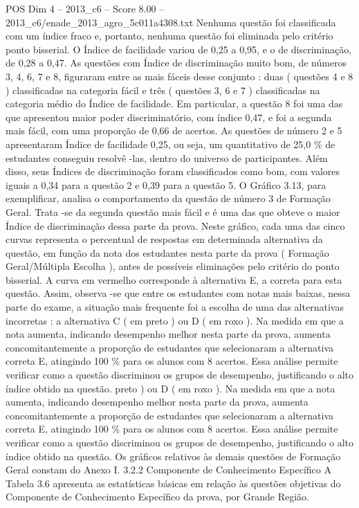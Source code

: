 \begin{textsample}{POS Dim 4 – 2013\_c6 – Score 8.00 – 2013\_c6/enade\_2013\_agro\_5c011a4308.txt}
Nenhuma questão foi classificada com um índice fraco e, portanto, nenhuma questão foi eliminada pelo critério ponto bisserial.
O Índice de facilidade variou de 0,25 a 0,95, e o de discriminação, de 0,28 a 0,47.
As questões com Índice de discriminação muito bom, de números 3, 4, 6, 7 e 8, figuraram entre as mais fáceis desse conjunto : duas ( questões 4 e 8 ) classificadas na categoria fácil e três ( questões 3, 6 e 7 ) classificadas na categoria médio do Índice de facilidade.
Em particular, a questão 8 foi uma das que apresentou maior poder discriminatório, com índice 0,47, e foi a segunda mais fácil, com uma proporção de 0,66 de acertos.
As questões de número 2 e 5 apresentaram Índice de facilidade 0,25, ou seja, um quantitativo de 25,0 \% de estudantes conseguiu resolvê -las, dentro do universo de participantes.
Além disso, seus Índices de discriminação foram classificados como bom, com valores iguais a 0,34 para a questão 2 e 0,39 para a questão 5.
O Gráfico 3.13, para exemplificar, analisa o comportamento da questão de número 3 de Formação Geral.
Trata -se da segunda questão mais fácil e é uma das que obteve o maior Índice de discriminação dessa parte da prova.
Neste gráfico, cada uma das cinco curvas representa o percentual de respostas em determinada alternativa da questão, em função da nota dos estudantes nesta parte da prova ( Formação Geral/Múltipla Escolha ), antes de possíveis eliminações pelo critério do ponto bisserial.
A curva em vermelho corresponde à alternativa E, a correta para esta questão.
Assim, observa -se que entre os estudantes com notas mais baixas, nessa parte do exame, a situação mais frequente foi a escolha de uma das alternativas incorretas : a alternativa C ( em preto ) ou D ( em roxo ).
Na medida em que a nota aumenta, indicando desempenho melhor nesta parte da prova, aumenta concomitantemente a proporção de estudantes que selecionaram a alternativa correta E, atingindo 100 \% para os alunos com 8 acertos.
Essa análise permite verificar como a questão discriminou os grupos de desempenho, justificando o alto índice obtido na questão. preto ) ou D ( em roxo ).
Na medida em que a nota aumenta, indicando desempenho melhor nesta parte da prova, aumenta concomitantemente a proporção de estudantes que selecionaram a alternativa correta E, atingindo 100 \% para os alunos com 8 acertos.
Essa análise permite verificar como a questão discriminou os grupos de desempenho, justificando o alto índice obtido na questão.
Os gráficos relativos às demais questões de Formação Geral constam do Anexo I. 3.2.2 Componente de Conhecimento Específico A Tabela 3.6 apresenta as estatísticas básicas em relação às questões objetivas do Componente de Conhecimento Específico da prova, por Grande Região.

\end{textsample}
